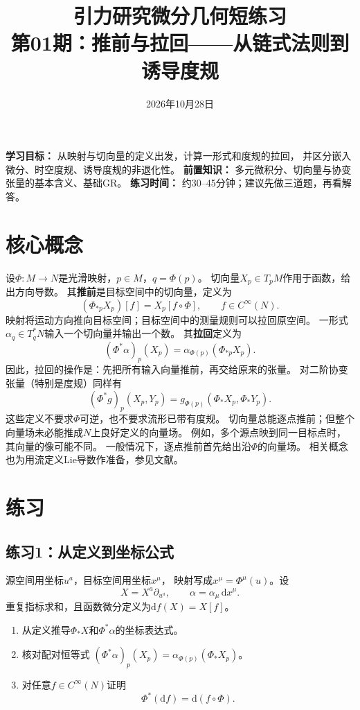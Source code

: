 \documentclass[11pt,a4paper,fontset=fandol]{ctexart}
\title{引力研究微分几何短练习\\[0.4em]
\large 第01期：推前与拉回——从链式法则到诱导度规}
\author{}
\date{2026年10月28日}
\newcommand{\dd}{\mathrm{d}}
\begin{document}
\maketitle
\noindent\textbf{学习目标：}
从映射与切向量的定义出发，计算一形式和度规的拉回，
并区分嵌入微分、时空度规、诱导度规的非退化性。
\textbf{前置知识：} 多元微积分、切向量与协变张量的基本含义、基础GR。
\textbf{练习时间：} 约30--45分钟；建议先做三道题，再看解答。

\section{核心概念}
设$\Phi:M\to N$是光滑映射，$p\in M$，$q=\Phi(p)$。
切向量$X_p\in T_pM$作用于函数，给出方向导数。
其\textbf{推前}是目标空间中的切向量，定义为
\begin{equation}
  (\Phi_{*p}X_p)[f]=X_p[f\circ\Phi],
  \qquad f\in C^\infty(N).
  \label{eq:push}
\end{equation}
映射将运动方向推向目标空间；目标空间中的测量规则可以拉回原空间。
一形式$\alpha_q\in T_q^*N$输入一个切向量并输出一个数。
其\textbf{拉回}定义为
\begin{equation}
  (\Phi^*\alpha)_p(X_p)
  =\alpha_{\Phi(p)}(\Phi_{*p}X_p).
  \label{eq:pull}
\end{equation}
因此，拉回的操作是：先把所有输入向量推前，再交给原来的张量。
对二阶协变张量（特别是度规）同样有
\begin{equation}
  (\Phi^*g)_p(X_p,Y_p)
  =g_{\Phi(p)}(\Phi_*X_p,\Phi_*Y_p).
  \label{eq:pullmetric}
\end{equation}
这些定义不要求$\Phi$可逆，也不要求流形已带有度规。
切向量总能逐点推前；但整个向量场未必能推成$N$上良好定义的向量场。
例如，多个源点映到同一目标点时，其向量的像可能不同。
一般情况下，逐点推前首先给出沿$\Phi$的向量场。
相关概念也为用流定义Lie导数作准备，参见文献\cite{tong2}。

\section{练习}
\subsection*{练习1：从定义到坐标公式}
源空间用坐标$u^a$，目标空间用坐标$x^\mu$，
映射写成$x^\mu=\Phi^\mu(u)$。设
\[
 X=X^a\partial_{u^a},\qquad
 \alpha=\alpha_\mu\,\dd x^\mu .
\]
重复指标求和，且函数微分定义为$\dd f(X)=X[f]$。
\begin{enumerate}[label=(\arabic*)]
  \item 从定义推导$\Phi_*X$和$\Phi^*\alpha$的坐标表达式。
  \item 核对配对恒等式
  $(\Phi^*\alpha)_p(X_p)=\alpha_{\Phi(p)}(\Phi_*X_p)$。
  \item 对任意$f\in C^\infty(N)$证明
  \[
    \boxed{\Phi^*(\dd f)=\dd(f\circ\Phi)}.
  \]
\end{enumerate}
\end{document}

